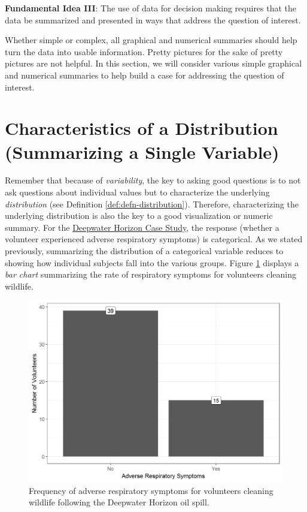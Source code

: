 \documentclass[]{book}
\theoremstyle{definition}
\theoremstyle{definition}
\theoremstyle{remark}
\let\BeginKnitrBlock\begin \let\EndKnitrBlock\end
\begin{document}
\BeginKnitrBlock{rmdfivefund}
\textbf{Fundamental Idea III}: The use of data for decision making
requires that the data be summarized and presented in ways that address
the question of interest.
\EndKnitrBlock{rmdfivefund}

Whether simple or complex, all graphical and numerical summaries should
help turn the data into usable information. Pretty pictures for the sake
of pretty pictures are not helpful. In this section, we will consider
various simple graphical and numerical summaries to help build a case
for addressing the question of interest.

\section{Characteristics of a Distribution (Summarizing a Single
Variable)}\label{characteristics-of-a-distribution-summarizing-a-single-variable}

Remember that because of \emph{variability}, the key to asking good
questions is to not ask questions about individual values but to
characterize the underlying \emph{distribution} (see Definition
\ref{def:defn-distribution}). Therefore, characterizing the underlying
distribution is also the key to a good visualization or numeric summary.
For the \protect\hyperlink{CaseDeepwater}{Deepwater Horizon Case Study},
the response (whether a volunteer experienced adverse respiratory
symptoms) is categorical. As we stated previously, summarizing the
distribution of a categorical variable reduces to showing how individual
subjects fall into the various groups. Figure
\ref{fig:summaries-deepwater-barchart} displays a \emph{bar chart}
summarizing the rate of respiratory symptoms for volunteers cleaning
wildlife.

\begin{figure}

{\centering \includegraphics[width=0.8\linewidth]{./Images/summaries-deepwater-barchart-1} 

}

\caption{Frequency of adverse respiratory symptoms for volunteers cleaning wildlife following the Deepwater Horizon oil spill.}\label{fig:summaries-deepwater-barchart}
\end{figure}
\end{document}
